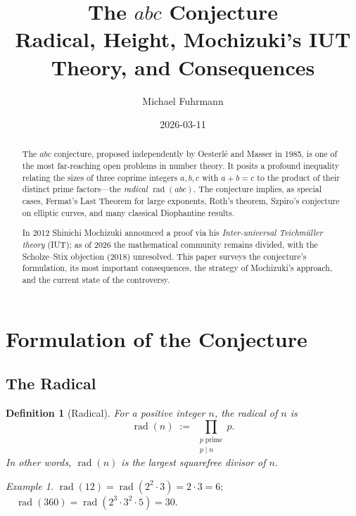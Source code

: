 \documentclass[12pt,a4paper]{article}
\title{\textbf{The $abc$ Conjecture}\\[0.5em]
\large Radical, Height, Mochizuki's IUT Theory, and Consequences}
\author{Michael Fuhrmann}
\date{2026-03-11}
\newtheorem{definition}[theorem]{Definition}
\theoremstyle{remark}
\newtheorem{example}[theorem]{Example}
\begin{document}
\maketitle
\begin{abstract}
The $abc$ conjecture, proposed independently by Oesterlé and Masser in 1985, is one of
the most far-reaching open problems in number theory.  It posits a profound inequality
relating the sizes of three coprime integers $a,b,c$ with $a+b=c$ to the product of
their distinct prime factors—the \emph{radical} $\operatorname{rad}(abc)$.  The conjecture
implies, as special cases, Fermat's Last Theorem for large exponents, Roth's theorem,
Szpiro's conjecture on elliptic curves, and many classical Diophantine results.

In 2012 Shinichi Mochizuki announced a proof via his \emph{Inter-universal Teichmüller
theory} (IUT); as of 2026 the mathematical community remains divided, with the
Scholze--Stix objection (2018) unresolved.  This paper surveys the conjecture's
formulation, its most important consequences, the strategy of Mochizuki's approach, and
the current state of the controversy.
\end{abstract}

\tableofcontents
\newpage

\section{Formulation of the Conjecture}

\subsection{The Radical}

\begin{definition}[Radical]
  For a positive integer $n$, the \emph{radical} of $n$ is
  \[
    \operatorname{rad}(n) \;:=\; \prod_{\substack{p\;\text{prime} \\ p \mid n}} p.
  \]
  In other words, $\operatorname{rad}(n)$ is the largest squarefree divisor of $n$.
\end{definition}

\begin{example}
  $\operatorname{rad}(12) = \operatorname{rad}(2^2\cdot 3) = 2\cdot 3 = 6$;
  $\quad \operatorname{rad}(360) = \operatorname{rad}(2^3\cdot 3^2\cdot 5) = 30$.
\end{example}
\end{document}
